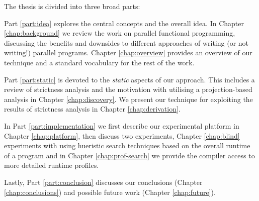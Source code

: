 The thesis is divided into three broad parts:

Part \ref{part:idea} explores the central concepts and the overall idea.  In
Chapter \ref{chap:background} we review the work on parallel functional
programming, discussing the benefits and downsides to different approaches of
writing (or not writing!) parallel programs.  Chapter \ref{chap:overview}
provides an overview of our technique and a standard vocabulary for the rest of
the work.  

Part \ref{part:static} is devoted to the \emph{static} aspects of our approach.
This includes a review of strictness analysis and the motivation with utilising
a projection-based analysis in Chapter \ref{chap:discovery}. We present our
technique for exploiting the results of strictness analysis in Chapter
\ref{chap:derivation}.

In Part \ref{part:implementation} we first describe our experimental platform
in Chapter \ref{chap:platform}, then discuss two experiments, Chapter
\ref{chap:blind} experiments with using hueristic search techniques based on
the overall runtime of a program and in Chapter \ref{chap:prof-search} we
provide the compiler access to more detailed runtime profiles. 

Lastly, Part \ref{part:conclusion} discusses our conclusions (Chapter
\ref{chap:conclusions}) and possible future work (Chapter \ref{chap:future}).
